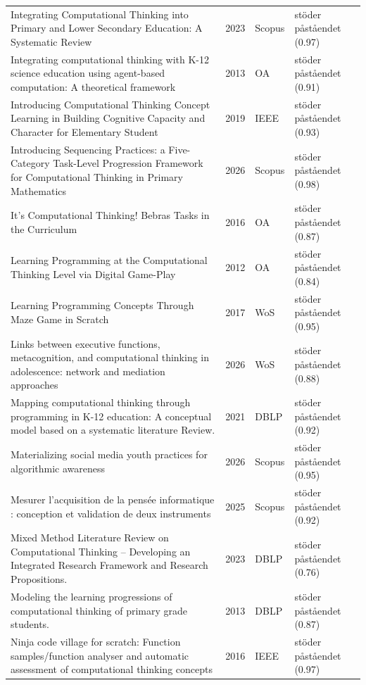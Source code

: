 \begin{longtable}{@{}%
  >{\raggedright\arraybackslash}p{}c%
  >{\raggedright\arraybackslash}p{}%
  >{\raggedright\arraybackslash}p{}@{}}
Integrating Computational Thinking into Primary and Lower Secondary Education: A Systematic Review & 2023 & Scopus & stöder påståendet (0.97) \\
Integrating computational thinking with K-12 science education using agent-based computation: A theoretical framework & 2013 & OA & stöder påståendet (0.91) \\
Introducing Computational Thinking Concept Learning in Building Cognitive Capacity and Character for Elementary Student & 2019 & IEEE & stöder påståendet (0.93) \\
Introducing Sequencing Practices: a Five-Category Task-Level Progression Framework for Computational Thinking in Primary Mathematics & 2026 & Scopus & stöder påståendet (0.98) \\
It's Computational Thinking! Bebras Tasks in the Curriculum & 2016 & OA & stöder påståendet (0.87) \\
Learning Programming at the Computational Thinking Level via Digital Game-Play & 2012 & OA & stöder påståendet (0.84) \\
Learning Programming Concepts Through Maze Game in Scratch & 2017 & WoS & stöder påståendet (0.95) \\
Links between executive functions, metacognition, and computational thinking in adolescence: network and mediation approaches & 2026 & WoS & stöder påståendet (0.88) \\
Mapping computational thinking through programming in K-12 education: A conceptual model based on a systematic literature Review. & 2021 & DBLP & stöder påståendet (0.92) \\
Materializing social media youth practices for algorithmic awareness & 2026 & Scopus & stöder påståendet (0.95) \\
Mesurer l'acquisition de la pensée informatique : conception et validation de deux instruments & 2025 & Scopus & stöder påståendet (0.92) \\
Mixed Method Literature Review on Computational Thinking -- Developing an Integrated Research Framework and Research Propositions. & 2023 & DBLP & stöder påståendet (0.76) \\
Modeling the learning progressions of computational thinking of primary grade students. & 2013 & DBLP & stöder påståendet (0.87) \\
Ninja code village for scratch: Function samples/function analyser and automatic assessment of computational thinking concepts & 2016 & IEEE & stöder påståendet (0.97) \\

\end{longtable}
